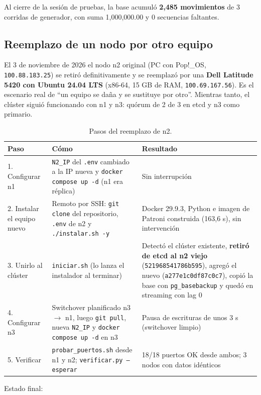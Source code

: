 \documentclass[11pt,a4paper]{article}
\newcommand{\cod}[1]{\texttt{#1}}
\newcommand{\flecha}{\ensuremath{\rightarrow}}
\begin{document}
Al cierre de la sesión de pruebas, la base acumuló \textbf{2,485 movimientos} de 3 corridas de generador, con suma 1,000,000.00 y 0 secuencias faltantes.

\subsection{Reemplazo de un nodo por otro equipo}
\label{sec:reemplazo}

El 3 de noviembre de 2026 el nodo n2 original (PC con Pop!\_OS, \cod{100.88.183.25}) se retiró definitivamente y se reemplazó por una \textbf{Dell Latitude 5420 con Ubuntu 24.04 LTS} (x86-64, 15 GB de RAM, \cod{100.69.167.56}). Es el escenario real de ``un equipo se daña y se sustituye por otro''. Mientras tanto, el clúster siguió funcionando con n1 y n3: quórum de 2 de 3 en etcd y n3 como primario.

\begin{table}[H]
\centering
\small
\caption{Pasos del reemplazo de n2.}
\begin{tabularx}{\textwidth}{@{}L{2.6cm}L{5.4cm}Y@{}}
\toprule
\textbf{Paso} & \textbf{Cómo} & \textbf{Resultado} \\
. Configurar n1 & \cod{N2\_IP} del \cod{.env} cambiado a la IP nueva y \cod{docker compose up -d} (n1 era réplica) & Sin interrupción \\
2. Instalar el equipo nuevo & Remoto por SSH: \cod{git clone} del repositorio, \cod{.env} de n2 y \cod{./instalar.sh -y} & Docker 29.9.3, Python e imagen de Patroni construida (163,6 s), sin intervención \\
3. Unirlo al clúster & \cod{iniciar.sh} (lo lanza el instalador al terminar) & Detectó el clúster existente, \textbf{retiró de etcd al n2 viejo} (\cod{521968541786b595}), agregó el nuevo (\cod{a277e1c0df87c0c7}), copió la base con \cod{pg\_basebackup} y quedó en streaming con lag 0 \\
4. Configurar n3 & Switchover planificado n3 \flecha{} n1, luego \cod{git pull}, nueva \cod{N2\_IP} y \cod{docker compose up -d} en n3 & Pausa de escrituras de unos 3 s (switchover limpio) \\
5. Verificar & \cod{probar\_puertos.sh} desde n1 y n2; \cod{verificar.py --esperar} & 18/18 puertos OK desde ambos; 3 nodos con datos idénticos \\
\bottomrule
\end{tabularx}
\end{table}

Estado final:
\end{document}
